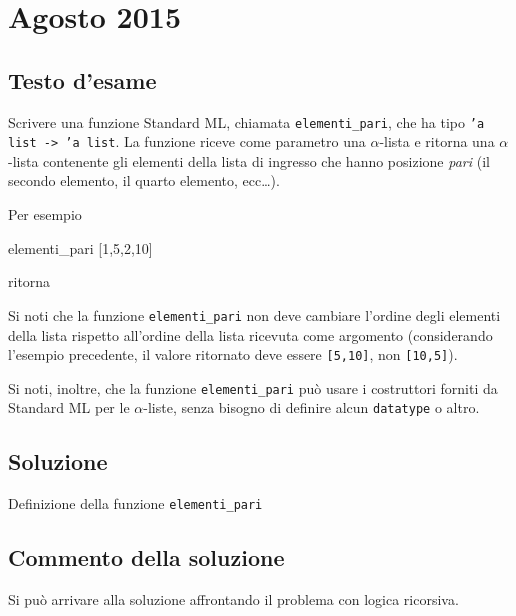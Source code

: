 \section{Agosto 2015}

\subsection{Testo d'esame}

Scrivere una funzione Standard ML, chiamata \texttt{elementi_pari}, che ha tipo \texttt{'a list -> 'a list}. La funzione riceve come parametro una \(\alpha\)-lista e ritorna una \(\alpha\)-lista contenente gli elementi della lista di ingresso che hanno posizione \emph{pari} (il secondo elemento, il quarto elemento, ecc\dots).

\medskip
Per esempio

\begin{smlcode}
elementi_pari [1,5,2,10]
\end{smlcode}

ritorna

\begin{smlcode}
[5,10]
\end{smlcode}

\medskip
Si noti che la funzione \texttt{elementi_pari} non deve cambiare l'ordine degli elementi della lista rispetto all'ordine della lista ricevuta come argomento (considerando l'esempio precedente, il valore ritornato deve essere \texttt{[5,10]}, non \texttt{[10,5]}).

\medskip
Si noti, inoltre, che la funzione \texttt{elementi_pari} può usare i costruttori forniti da Standard ML per le \(\alpha\)-liste, senza bisogno di definire alcun \texttt{datatype} o altro.

\subsection{Soluzione}

\begin{listing}[!h]
\caption[]{Definizione della funzione \texttt{elementi_pari}}
\end{listing}

\subsection{Commento della soluzione}

Si può arrivare alla soluzione affrontando il problema con logica ricorsiva.

